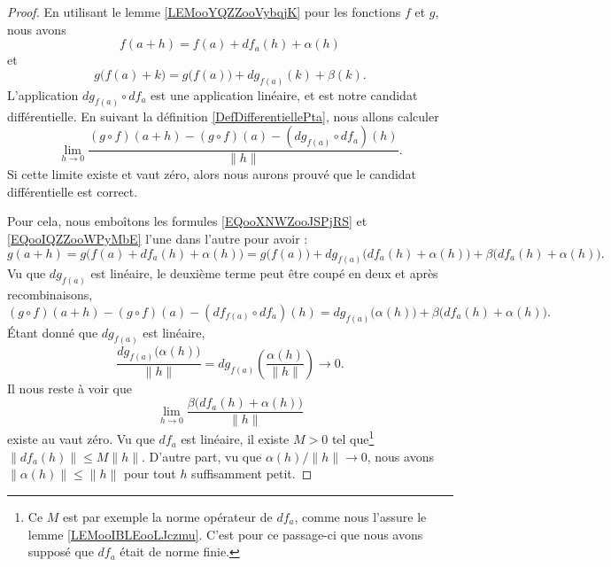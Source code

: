 \begin{proof}
    En utilisant le lemme \ref{LEMooYQZZooVybqjK} pour les fonctions \( f\) et \( g\), nous avons
    \begin{equation}        \label{EQooXNWZooJSPjRS}
        f(a+h)=f(a)+df_a(h)+\alpha(h)
    \end{equation}
    et
    \begin{equation}        \label{EQooIQZZooWPyMbE}
        g\big( f(a)+k \big)=g\big( f(a) \big)+dg_{f(a)}(k)+\beta(k).
    \end{equation}
    L'application \( dg_{f(a)}\circ df_a\) est une application linéaire, et est notre candidat différentielle. En suivant la définition \ref{DefDifferentiellePta}, nous allons calculer
    \begin{equation}
        \lim_{h\to 0} \frac{ (g\circ f)(a+h)-(g\circ f)(a)-(dg_{f(a)}\circ df_a)(h) }{ \| h \| }.
    \end{equation}
    Si cette limite existe et vaut zéro, alors nous aurons prouvé que le candidat différentielle est correct.

    Pour cela, nous emboîtons les formules \eqref{EQooXNWZooJSPjRS} et \eqref{EQooIQZZooWPyMbE} l'une dans l'autre pour avoir : 
    \begin{equation}
        g(a+h)=g\big( f(a)+df_a(h)+\alpha(h) \big)=g\big( f(a) \big)+dg_{f(a)}\big( df_a(h)+\alpha(h) \big)+\beta\big( df_a(h)+\alpha(h) \big).
    \end{equation}
    Vu que \( dg_{f(a)}\) est linéaire, le deuxième terme peut être coupé en deux et après recombinaisons,
    \begin{equation}
        (g\circ f)(a+h)-(g\circ f)(a)-(df_{f(a)}\circ df_a)(h)=dg_{f(a)}\big( \alpha(h) \big)+\beta\big( df_a(h)+\alpha(h) \big).
    \end{equation}
    Étant donné que \( dg_{f(a)}\) est linéaire,
    \begin{equation}
        \frac{ dg_{f(a)}\big(\alpha(h)\big) }{ \| h \| }=dg_{f(a)}\left( \frac{ \alpha(h) }{ \| h \| } \right)\to 0.
    \end{equation}
    Il nous reste à voir que
    \begin{equation}        \label{EQooUQNUooFgNyJp}
        \lim_{h\to 0} \frac{ \beta\big( df_a(h)+\alpha(h) \big) }{ \| h \| }
    \end{equation}
    existe au vaut zéro. Vu que \( df_a\) est linéaire, il existe \( M>0\) tel que\footnote{Ce \( M\) est par exemple la norme opérateur de \( df_a\), comme nous l'assure le lemme \ref{LEMooIBLEooLJczmu}. C'est pour ce passage-ci que nous avons supposé que \( df_a\) était de norme finie.} \( \| df_a(h) \|\leq M\| h \|\). D'autre part, vu que \( \alpha(h)/\| h \|\to 0\), nous avons \( \| \alpha(h) \|\leq \| h \|\) pour tout \( h\) suffisamment petit.


\end{proof}
